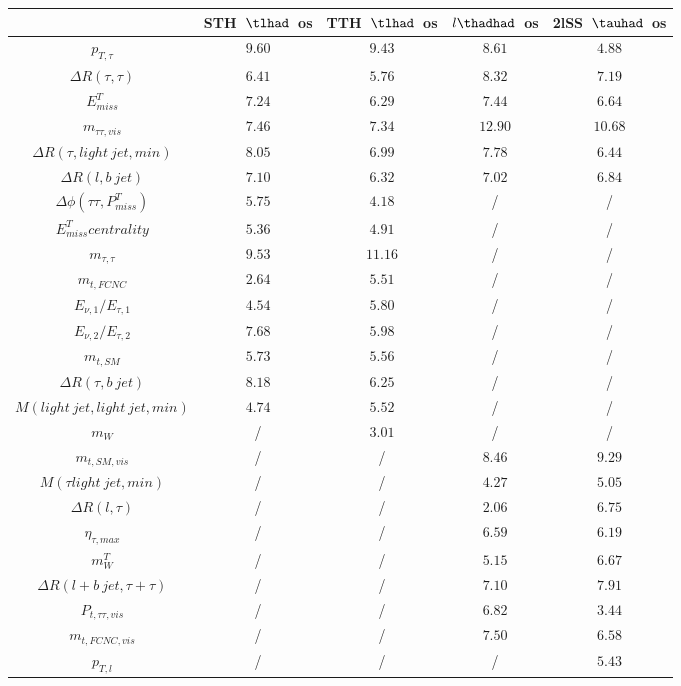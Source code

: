 \centering
\begin{tabular}{|c|c|c|c|c|} \hline
 & STH~$\tlhad$~os & TTH~$\tlhad$~os & $l\thadhad$~os & 2lSS~$\tauhad$~os\\\hline
$p_{T,\tau }$ & $9.60$ & $9.43$ & $8.61$ & $4.88$\\\hline
$\Delta R(\tau ,\tau )$ & $6.41$ & $5.76$ & $8.32$ & $7.19$\\\hline
$E^{T}_{miss}$ & $7.24$ & $6.29$ & $7.44$ & $6.64$\\\hline
$m_{\tau \tau ,vis}$ & $7.46$ & $7.34$ & $12.90$ & $10.68$\\\hline
$\Delta R(\tau ,light~jet,min)$ & $8.05$ & $6.99$ & $7.78$ & $6.44$\\\hline
$\Delta R(l,b~jet)$ & $7.10$ & $6.32$ & $7.02$ & $6.84$\\\hline
$\Delta\phi(\tau \tau ,P^{T}_{miss})$ & $5.75$ & $4.18$ &  / &  /\\\hline
$E^{T}_{miss} centrality$ & $5.36$ & $4.91$ &  / &  /\\\hline
$m_{\tau ,\tau }$ & $9.53$ & $11.16$ &  / &  /\\\hline
$m_{t,FCNC}$ & $2.64$ & $5.51$ &  / &  /\\\hline
$E_{\nu,1}/E_{\tau ,1}$ & $4.54$ & $5.80$ &  / &  /\\\hline
$E_{\nu,2}/E_{\tau ,2}$ & $7.68$ & $5.98$ &  / &  /\\\hline
$m_{t,SM}$ & $5.73$ & $5.56$ &  / &  /\\\hline
$\Delta R(\tau ,b~jet)$ & $8.18$ & $6.25$ &  / &  /\\\hline
$M(light~jet,light~jet,min)$ & $4.74$ & $5.52$ &  / &  /\\\hline
$m_{W}$ &  / & $3.01$ &  / &  /\\\hline
$m_{t,SM,vis}$ &  / &  / & $8.46$ & $9.29$\\\hline
$M(\tau  light~jet,min)$ &  / &  / & $4.27$ & $5.05$\\\hline
$\Delta R(l,\tau )$ &  / &  / & $2.06$ & $6.75$\\\hline
$\eta_{\tau ,max}$ &  / &  / & $6.59$ & $6.19$\\\hline
$m^{T}_{W}$ &  / &  / & $5.15$ & $6.67$\\\hline
$\Delta R(l+b~jet,\tau +\tau )$ &  / &  / & $7.10$ & $7.91$\\\hline
$P_{t,\tau \tau ,vis}$ &  / &  / & $6.82$ & $3.44$\\\hline
$m_{t,FCNC,vis}$ &  / &  / & $7.50$ & $6.58$\\\hline
$p_{T,l}$ &  / &  / &  / & $5.43$\\\hline
\end{tabular}
